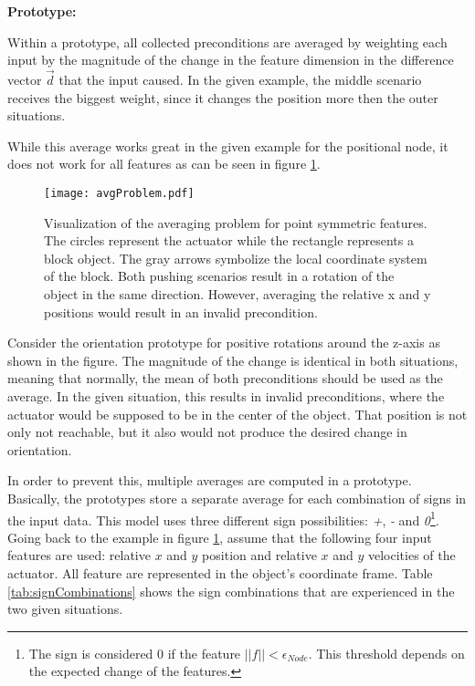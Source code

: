 \textbf{Prototype:}

Within a prototype, all collected preconditions are averaged by weighting each input by the magnitude of the change in the feature dimension in the difference vector $\vec{d}$ that the input caused.
In the given example, the middle scenario receives the biggest weight, since it changes the position more then the outer situations. 

While this average works great in the given example for the positional node, it does not work for all features as can be seen in figure \ref{fig:avgProblem}.

\begin{figure}
	\centering
	\texttt{[image: avgProblem.pdf]}
	\caption{Visualization of the averaging problem for point symmetric features. The circles represent the actuator while the rectangle represents a block object. The gray arrows symbolize the local coordinate system of the block. Both pushing scenarios result in a rotation of the object in the same direction. However, averaging the relative x and y positions would result in an invalid precondition.} 
	\label{fig:avgProblem}
\end{figure}

Consider the orientation prototype for positive rotations around the z-axis as shown in the figure. The magnitude of the change is identical in both situations, meaning that normally, the mean of both preconditions should be used as the average. In the given situation, this results in invalid preconditions, where the actuator would be supposed to be in the center of the object. That position is not only not reachable, but it also would not produce the desired change in orientation. 

In order to prevent this, multiple averages are computed in a prototype. Basically, the prototypes store a separate average for each combination of signs in the input data. This model uses three different sign possibilities: \textit{+}, \textit{-} and \textit{0}\footnote{The sign is considered 0 if the feature $||f|| < \epsilon_{Node}$. This threshold depends on the expected change of the features.}.
Going back to the example in figure \ref{fig:avgProblem}, assume that the following four input features are used: relative $x$ and $y$ position and relative $x$ and $y$ velocities of the actuator. All feature are represented in the object's coordinate frame. Table \ref{tab:signCombinations} shows the sign combinations that are experienced in the two given situations. 

